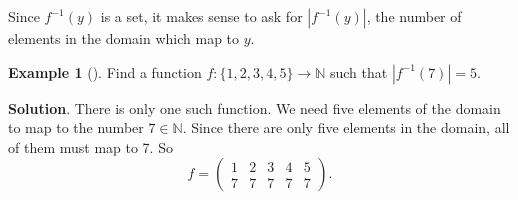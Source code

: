 \documentclass[10pt,]{book}
\theoremstyle{plain}
\theoremstyle{definition}
\theoremstyle{definition}
\newtheorem{example}[theorem]{Example}
\theoremstyle{definition}
\theoremstyle{definition}
\numberwithin{equation}{chapter}
\def\N{\mathbb N}
\def\inv{^{-1}}
\newcommand{\card}[1]{\left| #1 \right|}
\newcommand{\amp}{&}
\begin{document}
\hypertarget{p-1662}{}%
Since \(f\inv(y)\) is a set, it makes sense to ask for \(\card{f\inv(y)}\), the number of elements in the domain which map to \(y\).%
\begin{example}[]\label{example-54}
\hypertarget{p-1663}{}%
Find a function \(f:\{1,2,3,4,5\} \to \N\) such that \(\card{f\inv(7)} = 5\).%
\par\smallskip%
\noindent\textbf{Solution}.\hypertarget{solution-147}{}\quad%
\hypertarget{p-1664}{}%
There is only one such function. We need five elements of the domain to map to the number \(7 \in \N\). Since there are only five elements in the domain, all of them must map to 7. So%
\begin{equation*}
f = \begin{pmatrix}1 \amp 2 \amp 3 \amp 4 \amp 5 \\ 7 \amp 7 \amp 7 \amp 7 \amp 7\end{pmatrix}.
\end{equation*}
%
\end{example}
\end{document}

